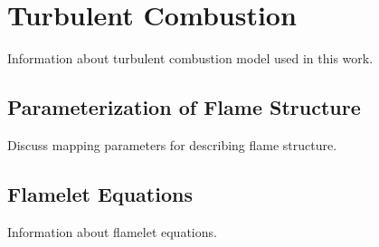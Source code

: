 \section{Turbulent Combustion}
\label{sec:lesmodels:combust}

Information about turbulent combustion model used in this work.


\subsection{Parameterization of Flame Structure}
\label{sec:lesmodels:combust:map}

Discuss mapping parameters for describing flame structure.


\subsection{Flamelet Equations}
\label{sec:lesmodels:combust:flamelet}

Information about flamelet equations.

